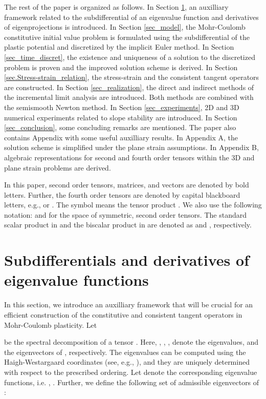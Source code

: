 \documentclass[a4paper,12pt]{article}
\theoremstyle{remark}
\numberwithin{equation}{section}
\begin{document}
The rest of the paper is organized as follows. In Section \ref{sec_spectrum}, an auxilliary framework related to the subdifferential of an eigenvalue function and derivatives of eigenprojections is introduced. In Section \ref{sec_model}, the Mohr-Coulomb constitutive initial value problem is formulated using the subdifferential of the plastic potential and discretized by the implicit Euler method. In Section \ref{sec_time_discret}, the existence and uniqueness of a solution to the discretized problem is proven and the improved solution scheme is derived. In Section \ref{sec.Stress-strain_relation}, the stress-strain and the consistent tangent operators are constructed. In Section \ref{sec_realization}, the direct and indirect methods of the incremental limit analysis are introduced. Both methods are combined with the semismooth Newton method. In Section \ref{sec_experiments}, 2D and 3D numerical experiments related to slope stability are introduced. In Section \ref{sec_conclusion}, some concluding remarks are mentioned. The paper also contains Appendix with some useful auxilliary results. In Appendix A, the solution scheme is simplified under the plane strain assumptions. In Appendix B, algebraic representations for second and fourth order tensors within the 3D and plane strain problems are derived.

In this paper, second order tensors, matrices, and vectors are denoted by
bold letters.  Further, the fourth order tensors
are denoted by capital blackboard letters, e.g.,  or . The symbol  means the tensor product \cite{NPO08}. We also use the following
notation:  and  for the space of symmetric, second order tensors. The standard scalar product in  and the biscalar product in  are denoted as  and , respectively.


\section{Subdifferentials and derivatives of eigenvalue functions}
\label{sec_spectrum}

In this section, we introduce an auxilliary framework that will be crucial for an efficient construction of the constitutive and consistent tangent operators in Mohr-Coulomb plasticity. Let

be the spectral decomposition of a tensor . Here, , , , denote the eigenvalues, and the eigenvectors of , respectively. The eigenvalues   can be computed using the Haigh-Westargaard coordinates (see, e.g., \cite[Appendix A]{NPO08}), and they are uniquely determined with respect to the prescribed ordering. Let  denote the corresponding eigenvalue functions, i.e. , . Further, we define the following set of admissible eigenvectors of : 
\end{document}
